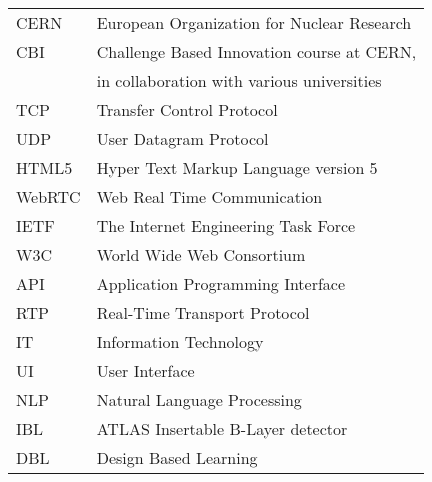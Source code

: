 \documentclass[english,12pt,a4paper,dvips]{article}
\begin{document}
\newpage
%








\tableofcontents



\begin{tabular}{ll}
CERN        & European Organization for Nuclear Research \\
CBI         & Challenge Based Innovation course at CERN,\\
            & in collaboration with various universities \\
TCP         & Transfer Control Protocol \\ %
UDP         & User Datagram Protocol \\
HTML5       & Hyper Text Markup Language version 5 \\
WebRTC      & Web Real Time Communication \\
IETF        & The Internet Engineering Task Force \\
W3C         & World Wide Web Consortium \\
API         & Application Programming Interface \\
RTP         & Real-Time Transport Protocol \\
IT          & Information Technology \\
UI          & User Interface \\
NLP         & Natural Language Processing \\
IBL         & ATLAS Insertable B-Layer detector \\
DBL         & Design Based Learning 
\end{tabular}
\end{document}
